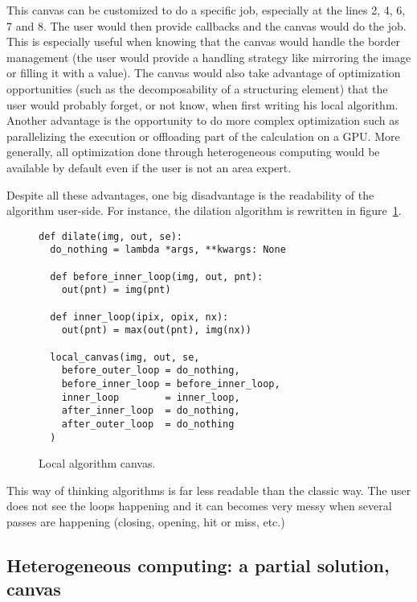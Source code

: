 This canvas can be customized to do a specific job, especially at the lines 2, 4, 6, 7 and 8. The user would then
provide callbacks and the canvas would do the job. This is especially useful when knowing that the canvas would handle
the border management (the user would provide a handling strategy like mirroring the image or filling it with a value).
The canvas would also take advantage of optimization opportunities (such as the decomposability of a structuring
element) that the user would probably forget, or not know, when first writing his local algorithm. Another advantage is
the opportunity to do more complex optimization such as parallelizing the execution or offloading part of the
calculation on a GPU. More generally, all optimization done through heterogeneous computing would be available by
default even if the user is not an area expert.

Despite all these advantages, one big disadvantage is the readability of the algorithm user-side. For instance, the
dilation algorithm is rewritten in figure~\ref{fig.local.algorithm.dilate}.

\begin{figure}[tbh]
  \centering
  \begin{verbatim}
def dilate(img, out, se):
  do_nothing = lambda *args, **kwargs: None

  def before_inner_loop(img, out, pnt):
    out(pnt) = img(pnt)
  
  def inner_loop(ipix, opix, nx):
    out(pnt) = max(out(pnt), img(nx))

  local_canvas(img, out, se,
    before_outer_loop = do_nothing,
    before_inner_loop = before_inner_loop,
    inner_loop        = inner_loop,
    after_inner_loop  = do_nothing,
    after_outer_loop  = do_nothing
  )
  \end{verbatim}

  \caption{Local algorithm canvas.}
  \label{fig.local.algorithm.dilate}
\end{figure}

This way of thinking algorithms is far less readable than the classic way. The user does not see the loops happening and
it can becomes very messy when several passes are happening (closing, opening, hit or miss, etc.)

\vspace{1cm}


\subsection{Heterogeneous computing: a partial solution, canvas}
\label{image_and_algorithms_taxonomy.canvas.subsec.heterogeneous}

